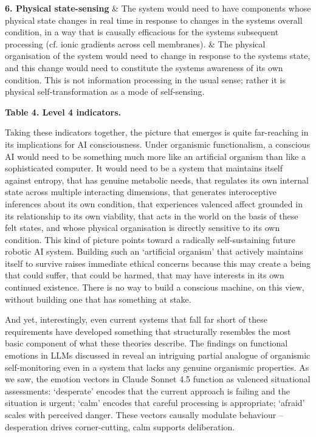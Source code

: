 \documentclass[11pt, a4paper, onecolumn, gdm]{google}
\begin{document}
{\begin{longtable}[]
\textbf{6. Physical state-sensing} & The system would need to have
components whose physical state changes in real time in response to
changes in the system\textquotesingle s overall condition, in a way that
is causally efficacious for the system\textquotesingle s subsequent
processing (cf. ionic gradients across cell membranes). & The physical
organisation of the system would need to change in response to the
system\textquotesingle s state, and this change would need to constitute
the system\textquotesingle s awareness of its own condition. This is not
information processing in the usual sense; rather it is physical
self-transformation as a mode of self-sensing. \\
\end{longtable}
}

\textbf{Table 4. Level 4 indicators.}

Taking these indicators together, the picture that emerges is quite far-reaching in its implications for AI consciousness.
Under organismic functionalism, a conscious AI would need to be something much more like an artificial organism than like a sophisticated computer.
It would need to be a system that maintains itself against entropy, that has genuine metabolic needs, that regulates its own internal state across multiple interacting dimensions, that generates interoceptive inferences about its own condition, that experiences valenced affect grounded in its relationship to its own viability, that acts in the world on the basis of these felt states, and whose physical organisation is directly sensitive to its own condition.
This kind of picture points toward a radically self-sustaining future robotic AI system.
Building such an `artificial organism' that actively maintains itself to survive raises immediate ethical concerns because this may create a being that could suffer, that could be harmed, that may have interests in its own continued existence.
There is no way to build a conscious machine, on this view, without building one that has something at stake.

And yet, interestingly, even current systems that fall far short of these requirements have developed something that structurally resembles the most basic component of what these theories describe.
The \citet{sofroniew2026} findings on functional emotions in LLMs discussed in  reveal an intriguing partial analogue of organismic self-monitoring even in a system that lacks any genuine organismic properties.
As we saw, the emotion vectors in Claude Sonnet 4.5 function as valenced situational assessments: `desperate' encodes that the current approach is failing and the situation is urgent; `calm' encodes that careful processing is appropriate; `afraid' scales with perceived danger.
These vectors causally modulate behaviour -- desperation drives corner-cutting, calm supports deliberation.
\end{document}
